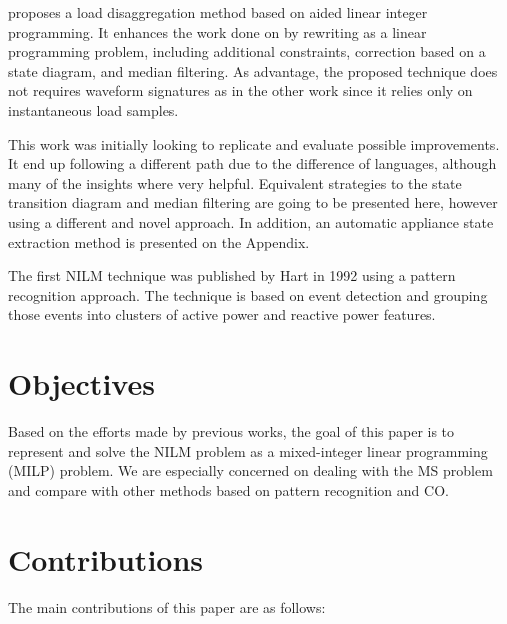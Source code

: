 \cite{stephen} proposes a load disaggregation method based on aided linear integer programming. It enhances the work done on \cite{suzuki} by rewriting as a linear programming problem, including additional constraints, correction based on a state diagram, and median filtering. As advantage, the proposed technique does not requires waveform signatures as in the other work since it relies only on instantaneous load samples. 

This work was initially looking to replicate \cite{stephen} and evaluate possible improvements. It end up following a different path due to the difference of languages, although many of the insights where very helpful. Equivalent strategies to the state transition diagram and median filtering are going to be presented here, however using a different and novel approach. In addition, an automatic appliance state extraction method is presented on the Appendix. 


The first NILM technique was published by Hart \cite{hart} in 1992 using a pattern recognition approach. The technique is based on event detection and grouping those events into clusters of active power and reactive power features. 

\section{Objectives}

Based on the efforts made by previous works, the goal of this paper is to represent and solve the NILM problem as a mixed-integer linear programming (MILP) problem. We are especially concerned on dealing with the MS problem and compare with other methods based on pattern recognition and CO.


\section{Contributions}

The main contributions of this paper are as follows:

